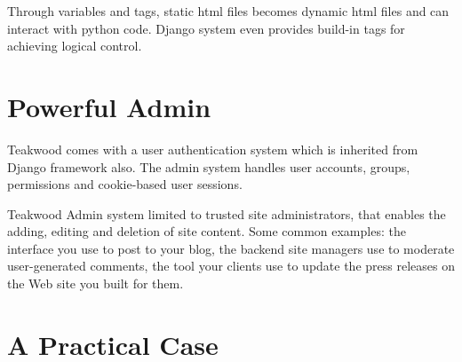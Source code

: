 Through variables and tags, static html files becomes dynamic html files and can interact with python code. Django system even provides build-in tags for achieving logical control.


\section{Powerful Admin}
Teakwood comes with a user authentication system which is inherited from Django framework also. The admin system handles user accounts, groups, permissions and cookie-based user sessions. 

Teakwood Admin system limited to trusted site administrators, that enables the adding, editing and deletion of site content. Some common examples: the interface you use to post to your blog, the backend site managers use to moderate user-generated comments, the tool your clients use to update the press releases on the Web site you built for them.

\section{A Practical Case}

